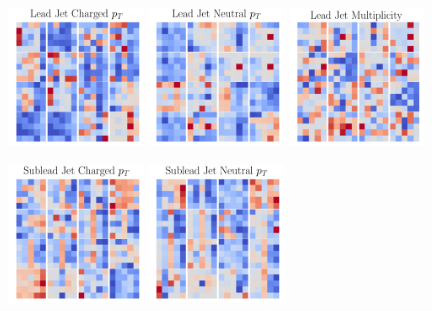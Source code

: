 \begin{figure}[h!]
    \begin{center}
        \includegraphics[width=0.32\textwidth]{figures/event_selection/front_filters_channel_0.pdf}
        \includegraphics[width=0.32\textwidth]{figures/event_selection/front_filters_channel_1.pdf}
        \includegraphics[width=0.32\textwidth]{figures/event_selection/front_filters_channel_2.pdf}
    \end{center}
    \begin{center}
        \includegraphics[width=0.32\textwidth]{figures/event_selection/front_filters_channel_3.pdf}
        \includegraphics[width=0.32\textwidth]{figures/event_selection/front_filters_channel_4.pdf}

\end{center}
\end{figure}
